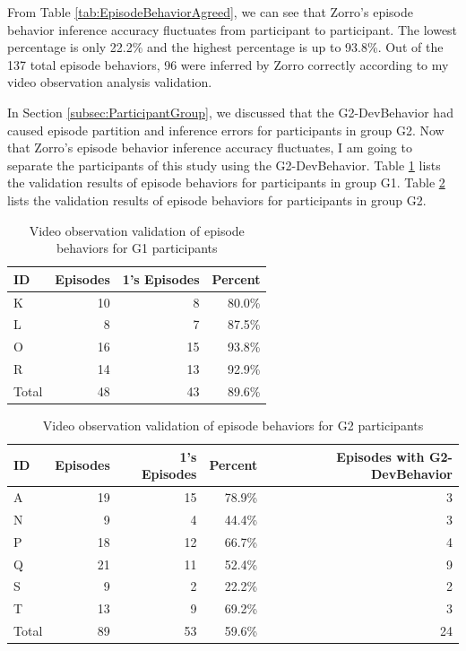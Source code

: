 From Table \ref{tab:EpisodeBehaviorAgreed}, we can see that Zorro's 
episode behavior inference accuracy fluctuates from participant to 
participant. The lowest percentage is only 22.2\% and the highest
percentage is up to 93.8\%. Out of the 137 total episode behaviors, 
96 were inferred by Zorro correctly according to my video observation
analysis validation.

In Section \ref{subsec:ParticipantGroup}, we discussed that the
G2-DevBehavior had caused episode partition and inference errors for
participants in group G2. Now that Zorro's episode behavior inference
accuracy fluctuates, I am going to separate the participants of
this study using the G2-DevBehavior. Table \ref{tab:EpisodeBehaviorAgreedG1} 
lists the validation results of episode behaviors for participants 
in group G1. Table \ref{tab:EpisodeBehaviorAgreedG2} lists 
the validation results of episode behaviors for participants in
group G2.
\begin{table}[!ht]
\centering
  \begin{tabular}{|l|r|r|r|}
  \hline
    ID & Episodes  & 1's Episodes & Percent \\ \hline
    K       & 10   &   8   &  80.0\%  \\ \hline
    L       &  8   &   7   &  87.5\%  \\ \hline  
    O       & 16   &  15   &  93.8\%  \\ \hline
    R       & 14   &  13   &  92.9\%  \\ \hline
    Total   & 48   &  43   &  89.6\%  \\ \hline
    \end{tabular}
  \caption{Video observation validation of episode behaviors for G1 participants}
  \label{tab:EpisodeBehaviorAgreedG1} 
\end{table}
\begin{table}[!ht]
\centering
  \begin{tabular}{|l|r|r|r|r|}
  \hline
    ID & Episodes  & 1's Episodes & Percent & Episodes with G2-DevBehavior\\ \hline
    A       & 19   &  15   &  78.9\%  & 3  \\ \hline  
    N       &  9   &   4   &  44.4\%  & 3  \\ \hline
    P       & 18   &  12   &  66.7\%  & 4  \\ \hline
    Q       & 21   &  11   &  52.4\%  & 9  \\ \hline
    S       &  9   &   2   &  22.2\%  & 2  \\ \hline
    T       & 13   &   9   &  69.2\%  & 3  \\ \hline
    Total   & 89   &  53   &  59.6\%  & 24 \\ \hline
    \end{tabular}
  \caption{Video observation validation of episode behaviors for G2 participants}
  \label{tab:EpisodeBehaviorAgreedG2} 
\end{table}
